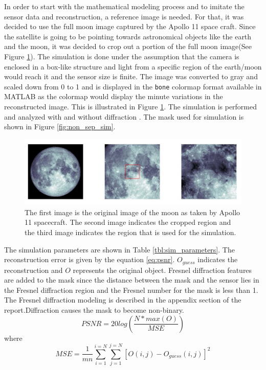 In order to start with the mathematical modeling process and to imitate the sensor data and reconstruction, a reference image is needed. For that, it was decided to use the full moon image captured by the Apollo 11 space craft\cite{MoonImage}. Since the satellite is going to be pointing towards astronomical objects like the earth and the moon, it was decided to crop out a portion of the full moon image(See Figure \ref{fig:moon_image}). The simulation is done under the assumption that the camera is enclosed in a box-like structure and light from a specific region of the earth/moon would reach it and the sensor size is finite. The image was converted to gray and scaled down from 0 to 1 and is displayed in the \texttt{bone} colormap format available in MATLAB as the colormap would display the minute variations in the reconstructed image. This is illustrated in Figure \ref{fig:moon_image}. The simulation is performed and analyzed with and without diffraction . The mask used for simulation is shown in Figure \ref{fig:non_sep_sim}.
\begin{figure}[ht]
\includegraphics[scale = 0.50]{pics/MoonImagePortion}
\caption{The first image is the original image of the moon as taken by Apollo 11 spacecraft. The second image indicates the cropped region and the third image indicates the region that is used for the simulation.}
\label{fig:moon_image}
\end{figure}
The simulation parameters are shown in Table \ref{tbl:sim_parameters}. The reconstruction error is given by the equation \ref{eq:psnr}. $O_{guess}$ indicates the reconstruction and $O$ represents the original object. Fresnel diffraction features are added to the mask since the distance between the mask and the sensor lies in the Fresnel diffraction region and the Fresnel number for the mask is less than  1. The Fresnel diffraction modeling is described in the appendix section of the report.Diffraction causes the mask to become non-binary.
\begin{equation}
PSNR = 20log(\frac{N*max(O)}{MSE})
\label{eq:psnr}
\end{equation}
where 
\begin{equation}
MSE = \frac{1}{mn}\sum_{i=1}^{i=N}\sum_{j=1}^{j=N}[O(i,j) - O_{guess}(i,j)]^2
\end{equation}

